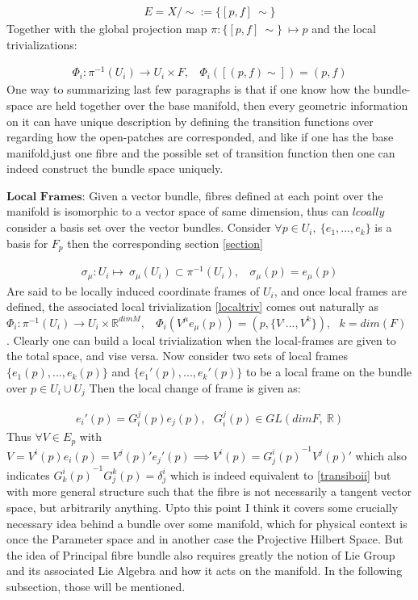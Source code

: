 \documentclass[8pt, twocoloumn]{article}
\begin{document}
\begin{align}
E = X / \sim := \{[p, f] \ \sim \}
\end{align}
Together with the global projection map $\pi: \{[p, f] \ \sim \}  \ \mapsto p$ and the local trivializations:

\begin{align}
\Phi_{i}: \pi^{-1}(U_{i}) \to   U_{i} \times F, \ \ \ \  \Phi_{i}([(p, f) \sim])=(p,f)
\end{align}
One way to summarizing last few paragraphs is that if one know how the bundle-space are held together over the base manifold, then every geometric information on it can have unique description by defining the transition functions over regarding how the open-patches are corresponded, and like if one has the base manifold,just one fibre and the possible set of transition function then one can indeed construct the bundle space uniquely. 

$\textbf{Local Frames:}$ Given a vector bundle, fibres defined at each point over the manifold is isomorphic to a vector space of same dimension, thus can $lcoally$ consider a basis set over the vector bundles.
Consider $\forall p \in U_i, \ \{ e_1, . . ., e_{k} \}$ is a basis for $F_p$ then the corresponding section \ref{section} 

\begin{align}
\sigma_{\mu} : U_i \mapsto \ \sigma_{\mu}(U_i) \subset \pi^{-1}(U_i), \ \ \ \ \sigma_{\mu}(p)= e_{\mu}(p) 
\end{align}
 Are said to be locally induced coordinate frames of $U_i$, and once local frames are defined, the associated local trivialization \ref{localtriv} comes out naturally as $\Phi_{i}: \pi^{-1}(U_{i}) \to   U_{i} \times \mathbb{R}^{dim M}, \ \ \ \ \Phi_{i}(V^{\mu} e_{\mu}(p)) = (p, \{ V^, . . ., V^{k}\}),  \ \ \ k = dim(F)$ . Clearly one can build a local trivialization when the local-frames are given to the total space, and vise versa. Now consider two sets of local frames $\{ e_{1}(p), . . ., e_k(p) \}$ and $\{ {e_{1}}'(p), . . ., {e_k}'(p) \}$ to be a local frame on the bundle over $p \in U_i \cup U_j$ Then the local change of frame is given as: 
 
 \begin{align}
 {e_{i}}'(p) = G_{i}^{j}(p) e_{j}(p), \ \ \ G_{i}^{j}(p) \in GL(dim F, \ \mathbb{R})
 \end{align}
 Thus $\forall V \in E_{p}$ with $V = V^i(p) e_{i}(p) = {V^j(p)}' {e_{j}}'(p) \implies V^i(p) = {G_{j}^{i}(p)}^{-1} {V^j(p)}'$ which also indicates ${G_{k}^{i}(p)}^{-1} {G_{j}^{k}(p)} = \delta^{i}_{j}$ which is indeed equivalent to \ref{transiboii} but with more general structure such that the fibre is not necessarily a tangent vector space, but arbitrarily anything. Upto this point I think it covers some crucially necessary idea behind a bundle over some manifold, which for physical context is once the Parameter space and in another case the Projective Hilbert Space. But the idea of Principal fibre bundle also requires greatly the notion of Lie Group and its associated Lie Algebra and how it acts on the manifold. In the following subsection, those will be mentioned.
 
\end{document}
